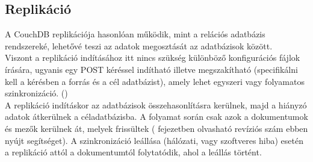 		\subsection{Replikáció}
			A CouchDB replikációja hasonlóan működik, mint a relációs adatbázis rendszereké, lehetővé teszi az adatok megosztását az adatbázisok között.\\
			Viszont a replikáció indításához itt nincs szükség különböző konfigurációs fájlok írására, ugyanis egy POST kéréssel indítható illetve megszakítható (specifikálni kell a kérésben a forrás és a cél adatbázist), amely lehet egyszeri vagy folyamatos szinkronizáció. ()\\
			A replikáció indításkor az adatbázisok összehasonlításra kerülnek, majd a hiányzó adatok átkerülnek a céladatbázisba. A folyamat során csak azok a dokumentumok és mezők kerülnek át, melyek frissültek ( fejezetben olvasható revíziós szám ebben nyújt segítséget). A szinkronizáció leállása (hálózati, vagy szoftveres hiba) esetén a replikáció attól a dokumentumtól folytatódik, ahol a leállás történt.
			
		\hfill\\

